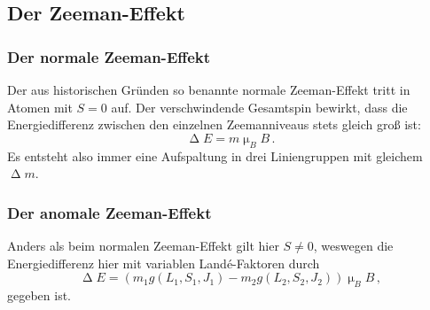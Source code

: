 \subsection{Der Zeeman-Effekt}
\subsubsection{Der normale Zeeman-Effekt}
Der aus historischen Gründen so benannte normale Zeeman-Effekt tritt in Atomen mit $S=0$ auf. Der verschwindende Gesamtspin bewirkt, dass die Energiedifferenz zwischen den einzelnen Zeemanniveaus stets gleich groß ist:
\begin{equation}
  \upDelta E=m\upmu_B B\,.
\end{equation}
Es entsteht also immer eine Aufspaltung in drei Liniengruppen mit gleichem $\upDelta m$.
\subsubsection{Der anomale Zeeman-Effekt}
Anders als beim normalen Zeeman-Effekt gilt hier $S\neq 0$, weswegen die Energiedifferenz hier mit variablen Landé-Faktoren durch
\begin{equation}
\upDelta E = \left(m_1 g(L_1,S_1,J_1)-m_2g(L_2,S_2,J_2)\right)\upmu_B B\,,
\label{eq:lande}
\end{equation}
gegeben ist.
\clearpage
